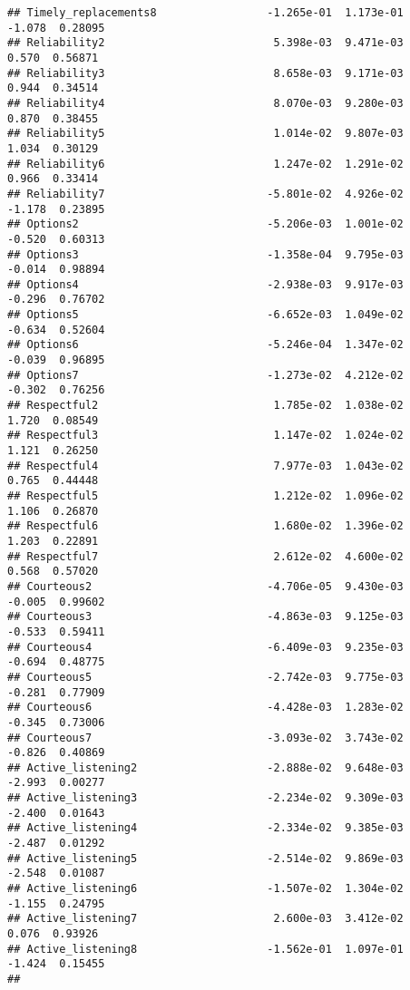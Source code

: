 \documentclass[
]{article}
\begin{document}
\begin{verbatim}
## Timely_replacements8                 -1.265e-01  1.173e-01    -1.078  0.28095
## Reliability2                          5.398e-03  9.471e-03     0.570  0.56871
## Reliability3                          8.658e-03  9.171e-03     0.944  0.34514
## Reliability4                          8.070e-03  9.280e-03     0.870  0.38455
## Reliability5                          1.014e-02  9.807e-03     1.034  0.30129
## Reliability6                          1.247e-02  1.291e-02     0.966  0.33414
## Reliability7                         -5.801e-02  4.926e-02    -1.178  0.23895
## Options2                             -5.206e-03  1.001e-02    -0.520  0.60313
## Options3                             -1.358e-04  9.795e-03    -0.014  0.98894
## Options4                             -2.938e-03  9.917e-03    -0.296  0.76702
## Options5                             -6.652e-03  1.049e-02    -0.634  0.52604
## Options6                             -5.246e-04  1.347e-02    -0.039  0.96895
## Options7                             -1.273e-02  4.212e-02    -0.302  0.76256
## Respectful2                           1.785e-02  1.038e-02     1.720  0.08549
## Respectful3                           1.147e-02  1.024e-02     1.121  0.26250
## Respectful4                           7.977e-03  1.043e-02     0.765  0.44448
## Respectful5                           1.212e-02  1.096e-02     1.106  0.26870
## Respectful6                           1.680e-02  1.396e-02     1.203  0.22891
## Respectful7                           2.612e-02  4.600e-02     0.568  0.57020
## Courteous2                           -4.706e-05  9.430e-03    -0.005  0.99602
## Courteous3                           -4.863e-03  9.125e-03    -0.533  0.59411
## Courteous4                           -6.409e-03  9.235e-03    -0.694  0.48775
## Courteous5                           -2.742e-03  9.775e-03    -0.281  0.77909
## Courteous6                           -4.428e-03  1.283e-02    -0.345  0.73006
## Courteous7                           -3.093e-02  3.743e-02    -0.826  0.40869
## Active_listening2                    -2.888e-02  9.648e-03    -2.993  0.00277
## Active_listening3                    -2.234e-02  9.309e-03    -2.400  0.01643
## Active_listening4                    -2.334e-02  9.385e-03    -2.487  0.01292
## Active_listening5                    -2.514e-02  9.869e-03    -2.548  0.01087
## Active_listening6                    -1.507e-02  1.304e-02    -1.155  0.24795
## Active_listening7                     2.600e-03  3.412e-02     0.076  0.93926
## Active_listening8                    -1.562e-01  1.097e-01    -1.424  0.15455
##                                         

\end{verbatim}
\end{document}
